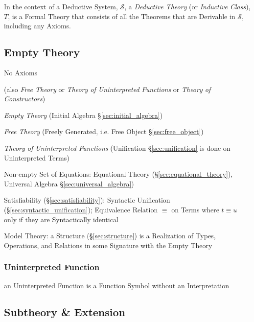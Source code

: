 In the context of a Deductive System, $\mathcal{S}$, a \emph{Deductive
  Theory} (or \emph{Inductive Class}), $T$, is a Formal Theory that
consists of all the Theorems that are Derivable in $\mathcal{S}$,
including any Axioms.



\subsection{Empty Theory}\label{sec:empty_theory}

No Axioms

(also \emph{Free Theory} or \emph{Theory of Uninterpreted Functions}
or \emph{Theory of Constructors})

\emph{Empty Theory} (Initial Algebra \S\ref{sec:initial_algebra})

\emph{Free Theory} (Freely Generated, i.e. Free Object
\S\ref{sec:free_object})

\emph{Theory of Uninterpreted Functions} (Unification
\S\ref{sec:unification} is done on Uninterpreted Terms)


Non-empty Set of Equations: Equational Theory
(\S\ref{sec:equational_theory}), Universal Algebra
\S\ref{sec:universal_algebra})

Satisfiability (\S\ref{sec:satisfiability}): Syntactic Unification
(\S\ref{sec:syntactic_unification}); Equivalence Relation $\equiv$ on
Terms where $t \equiv u$ only if they are Syntactically identical

Model Theory: a Structure (\S\ref{sec:structure}) is a Realization of
Types, Operations, and Relations in some Signature with the Empty
Theory



\subsubsection{Uninterpreted Function}
\label{sec:uninterpreted_function}

an Uninterpreted Function is a Function Symbol without an
Interpretation



\subsection{Subtheory \& Extension}\label{sec:subtheory}

